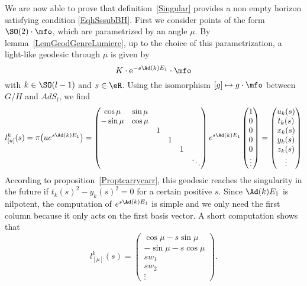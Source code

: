 We are now able to prove that definition~\ref{Singular} provides a non empty horizon satisfying condition \eqref{EqhSssubBH}.  First we  consider points of the form $\SO(2)\cdot\mfo$, which are parametrized by an angle $\mu$. By lemma~\ref{LemGeodGenreLumiere}, up to the choice of this parametrization, a light-like geodesic through $\mu$ is given by
\begin{equation}
	K\cdot \mbox{e}^{-s\Ad(k)E_1}\cdot\mfo
\end{equation}
with $k\in \SO(l-1)$ and  $s\in\eR$. Using the isomorphism $[g]\mapsto g\cdot \mfo$ between $G/H$ and $AdS_l$, we find
\begin{equation}		\label{EqhohnCondHOrExpl}
	l^k_{[u]}(s)= \pi\big( u e^{s\Ad(k)E_1} \big)=
	\begin{pmatrix}
		\cos\mu  & \sin\mu                      \\
		-\sin\mu & \cos\mu                      \\
		         &         & 1                  \\
		         &         &   & 1              \\
		         &         &   &   & 1          \\
		         &         &   &   &   & \ddots
	\end{pmatrix}
	e^{s\Ad(k)E_1}
	\begin{pmatrix}
		1 \\0\\0\\0\\0\\\vdots
	\end{pmatrix}
	=
	\begin{pmatrix}
		u_{k}(s) \\t_{k}(s)\\x_{k}(s)\\y_{k}(s)\\z_{k}(s)\\\vdots
	\end{pmatrix}
\end{equation}
According to proposition~\ref{Proptcarrycarr}, this geodesic reaches the singularity in the future if $t_{k}(s)^{2}-y_{k}(s)^{2}=0$ for a certain positive $s$. Since $\Ad(k)E_1$ is nilpotent, the computation of $ e^{s\Ad(k)E_1}$ is simple and we only need the first column because it only acts on the first basis vector. A short computation shows that
\begin{equation}  \label{EqGedCompo}
	l_{[\mu]}^{k}(s)=
	\begin{pmatrix}
		\cos\mu-s\sin\mu  \\
		-\sin\mu-s\cos\mu \\
		sw_{1}            \\
		sw_{2}            \\
		\vdots
	\end{pmatrix}.
\end{equation}

